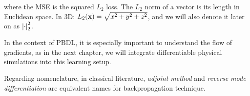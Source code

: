 where the \acf{MSE} is the squared $L_2$ loss. The $L_2$ norm of a vector is its
length in Euclidean space. In 3D: $L_2(\vb{x}) = \sqrt{x^2 + y^2 + z^2}$, and we
will also denote it later on as $\abs{\cdot}_2^2$.

In the context of \acf{PBDL}, it is especially important to understand the flow
of gradients, as in the next chapter, we will integrate differentiable physical
simulations into this learning setup.

Regarding nomenclature, in classical literature, \textit{adjoint method} and
\textit{reverse mode differentiation} are equivalent names for backpropagation
technique.





